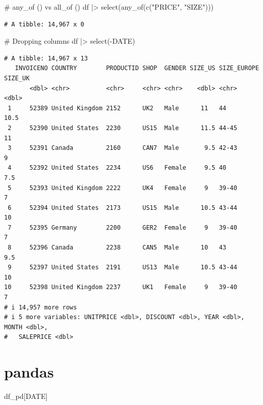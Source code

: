 \documentclass[
  letterpaper,
  DIV=11,
  numbers=noendperiod]{scrreprt}
\newenvironment{Shaded}{\begin{snugshade}}{\end{snugshade}}
\newcommand{\CommentTok}[1]{\textcolor[rgb]{0.37,0.37,0.37}{#1}}
\newcommand{\FunctionTok}[1]{\textcolor[rgb]{0.28,0.35,0.67}{#1}}
\newcommand{\NormalTok}[1]{\textcolor[rgb]{0.00,0.23,0.31}{#1}}
\newcommand{\SpecialCharTok}[1]{\textcolor[rgb]{0.37,0.37,0.37}{#1}}
\newcommand{\StringTok}[1]{\textcolor[rgb]{0.13,0.47,0.30}{#1}}
\begin{document}
\begin{Shaded}
\begin{Highlighting}[]
\CommentTok{\# any\_of () vs all\_of ()}
\NormalTok{df }\SpecialCharTok{|\textgreater{}}
    \FunctionTok{select}\NormalTok{(}\FunctionTok{any\_of}\NormalTok{(}\FunctionTok{c}\NormalTok{(}\StringTok{"PRICE"}\NormalTok{, }\StringTok{"SIZE"}\NormalTok{)))}
\end{Highlighting}
\end{Shaded}

\begin{verbatim}
# A tibble: 14,967 x 0
\end{verbatim}

\begin{Shaded}
\begin{Highlighting}[]
\CommentTok{\# Dropping columns }
\NormalTok{df }\SpecialCharTok{|\textgreater{}}
    \FunctionTok{select}\NormalTok{(}\SpecialCharTok{{-}}\NormalTok{DATE)}
\end{Highlighting}
\end{Shaded}

\begin{verbatim}
# A tibble: 14,967 x 13
   INVOICENO COUNTRY        PRODUCTID SHOP  GENDER SIZE_US SIZE_EUROPE SIZE_UK
       <dbl> <chr>          <chr>     <chr> <chr>    <dbl> <chr>         <dbl>
 1     52389 United Kingdom 2152      UK2   Male      11   44             10.5
 2     52390 United States  2230      US15  Male      11.5 44-45          11  
 3     52391 Canada         2160      CAN7  Male       9.5 42-43           9  
 4     52392 United States  2234      US6   Female     9.5 40              7.5
 5     52393 United Kingdom 2222      UK4   Female     9   39-40           7  
 6     52394 United States  2173      US15  Male      10.5 43-44          10  
 7     52395 Germany        2200      GER2  Female     9   39-40           7  
 8     52396 Canada         2238      CAN5  Male      10   43              9.5
 9     52397 United States  2191      US13  Male      10.5 43-44          10  
10     52398 United Kingdom 2237      UK1   Female     9   39-40           7  
# i 14,957 more rows
# i 5 more variables: UNITPRICE <dbl>, DISCOUNT <dbl>, YEAR <dbl>, MONTH <dbl>,
#   SALEPRICE <dbl>
\end{verbatim}

\section{pandas}

\begin{Shaded}
\begin{Highlighting}[]
\NormalTok{df\_pd[}\StringTok{\textquotesingle{}DATE\textquotesingle{}}\NormalTok{]   }
\end{Highlighting}
\end{Shaded}
\end{document}
